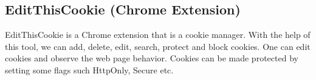 \subsection{EditThisCookie (Chrome Extension)}
EditThisCookie is a Chrome extension that is a cookie manager. With the help of this tool, we can add, delete, edit, search, protect and block cookies.
One can edit cookies and observe the web page behavior. Cookies can be made protected by setting some flags such HttpOnly, Secure etc.